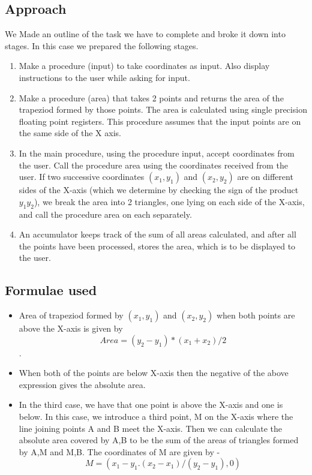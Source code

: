 \documentclass{article}
\begin{document}
\subsection{Approach}
    We Made an outline of the task we have to complete and broke it down into stages.
    In this case we prepared the following stages. 
    \begin{enumerate}
        \item Make a procedure (input) to take coordinates as input.
        Also display instructions to the user while asking for input. 
        \item Make a procedure (area) that takes 2 points and returns the area of the 
        trapeziod formed by those points. The area is calculated using single precision
        floating point registers. This procedure assumes that the input points are on the same side of the X axis.
        \item In the main procedure, using the procedure input, accept coordinates from the user.
        Call the procedure area using the coordinates received from the user. If two successive coordinates \( (x_1, y_1) \) and \( (x_2, y_2) \) are on different
        sides of the X-axis (which we determine by checking the sign of the product \( y_1y_2 \)), we break the area into 2 triangles, one lying on each side of the X-axis, and call the procedure
        area on each separately.
        \item An accumulator keeps track of the sum of all areas calculated, and after all the points have
        been processed, stores the area, which is to be displayed to the user. 
    \end{enumerate}
\subsection{Formulae used}
\begin{itemize}
    \item Area of trapeziod formed by \( (x_1, y_1) \) and \( (x_2, y_2) \)  when both points are above the X-axis is given by \[ Area = (y_2 - y_1)*(x_1 + x_2)/2 \].
    \item When both of the points are below X-axis then the negative of the above expression gives the absolute area.
    \item In the third case, we have that one point is above the X-axis and one is below. In this case, we introduce a third point, M on the X-axis where the line joining points A and B meet
    the X-axis. Then we can calculate the absolute area covered by A,B to be the sum of the areas of triangles formed by A,M and M,B. The coordinates of M are given by - \[ M = (x_1 -  y_1.(x_2 - x_1)/(y_2 - y_1),0)\]
\end{itemize}
\end{document}
